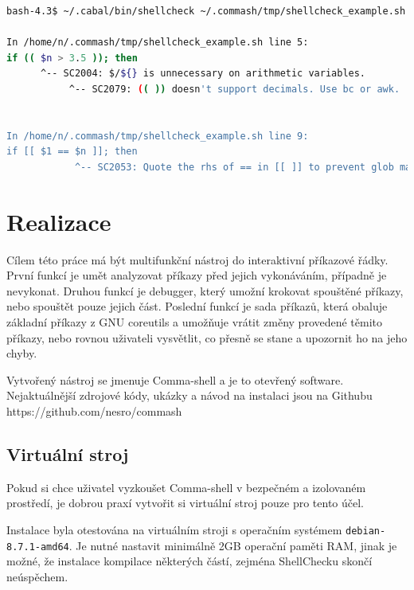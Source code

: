 \documentclass[thesis=M,czech]{FITthesis}[2012/06/26]
\begin{document}
\begin{minipage}{\linewidth}
\begin{lstlisting}[language=bash, caption={ShellCheck}, label={lst:debugtrap}]
bash-4.3$ ~/.cabal/bin/shellcheck ~/.commash/tmp/shellcheck_example.sh 

In /home/n/.commash/tmp/shellcheck_example.sh line 5:
if (( $n > 3.5 )); then
      ^-- SC2004: $/${} is unnecessary on arithmetic variables.
           ^-- SC2079: (( )) doesn't support decimals. Use bc or awk.


In /home/n/.commash/tmp/shellcheck_example.sh line 9:
if [[ $1 == $n ]]; then
            ^-- SC2053: Quote the rhs of == in [[ ]] to prevent glob matching.
\end{lstlisting}
\end{minipage}



\chapter{Realizace}

Cílem této práce má být multifunkční nástroj do interaktivní příkazové řádky. První funkcí je umět analyzovat příkazy před jejich vykonáváním, případně je nevykonat. Druhou funkcí je debugger, který umožní krokovat spouštěné příkazy, nebo spouštět pouze jejich část. Poslední funkcí je sada příkazů, která obaluje základní příkazy z GNU coreutils a umožňuje vrátit změny provedené těmito příkazy, nebo rovnou uživateli vysvětlit, co přesně se stane a upozornit ho na jeho chyby.

Vytvořený nástroj se jmenuje Comma-shell a je to otevřený software. Nejaktuálnější zdrojové kódy, ukázky a návod na instalaci jsou na Githubu https://github.com/nesro/commash

%
\section{Virtuální stroj}

Pokud si chce uživatel vyzkoušet Comma-shell v bezpečném a izolovaném prostředí, je dobrou praxí vytvořit si virtuální stroj pouze pro tento účel.

Instalace byla otestována na virtuálním stroji s operačním systémem \texttt{debian-8.7.1-amd64}. Je nutné nastavit minimálně 2GB operační paměti RAM, jinak je možné, že instalace kompilace některých částí, zejména ShellChecku skončí neúspěchem.
\end{document}
